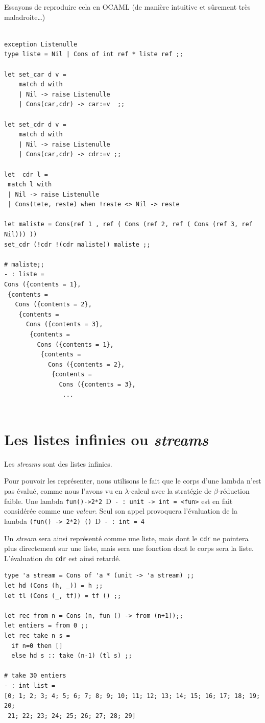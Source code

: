 \documentclass[11pt]{book}
\newcommand{\imp}{{\letterimp D}\hspace{0.1cm}}
\begin{document}
Essayons de reproduire cela en OCAML
(de manière intuitive et sûrement très maladroite\ldots)
\begin{Verbatim}

exception Listenulle
type liste = Nil | Cons of int ref * liste ref ;;

let set_car d v =
	match d with
	| Nil -> raise Listenulle
	| Cons(car,cdr) -> car:=v  ;;
	
let set_cdr d v =
	match d with
	| Nil -> raise Listenulle
	| Cons(car,cdr) -> cdr:=v ;;
	
let  cdr l =
 match l with
 | Nil -> raise Listenulle
 | Cons(tete, reste) when !reste <> Nil -> reste

let maliste = Cons(ref 1 , ref ( Cons (ref 2, ref ( Cons (ref 3, ref Nil))) ))
set_cdr (!cdr !(cdr maliste)) maliste ;;

# maliste;;
- : liste =
Cons ({contents = 1},
 {contents =
   Cons ({contents = 2},
    {contents =
      Cons ({contents = 3},
       {contents =
         Cons ({contents = 1},
          {contents =
            Cons ({contents = 2},
             {contents =
               Cons ({contents = 3},
               	...
               	
\end{Verbatim}

\section{Les listes infinies ou \textit{streams}}	
Les \textit{streams} sont des listes infinies.

Pour pouvoir les représenter, nous utilisons le fait que le corps d'une lambda n'est pas évalué, 
comme nous l'avons vu en $\lambda$-calcul avec la
stratégie de $\beta$-réduction faible.
Une lambda \verb+fun()->2*2+\ \imp\ \verb+- : unit -> int = <fun>+ est en fait considérée 
comme une \textit{valeur}. Seul son appel provoquera l'évaluation de la lambda
\verb+(fun() -> 2*2) ()+\ \imp\  \verb+- : int = 4+

Un \textit{stream} sera ainsi représenté comme une liste, mais dont le \verb+cdr+ ne pointera plus directement 
sur une liste, mais sera une fonction dont le corps sera la liste. L'évaluation du \verb+cdr+ est ainsi retardé.
 
\begin{Verbatim}
type 'a stream = Cons of 'a * (unit -> 'a stream) ;;
let hd (Cons (h, _)) = h ;;
let tl (Cons (_, tf)) = tf () ;;

let rec from n = Cons (n, fun () -> from (n+1));;
let entiers = from 0 ;;
let rec take n s =
  if n=0 then []
  else hd s :: take (n-1) (tl s) ;;

# take 30 entiers
- : int list =
[0; 1; 2; 3; 4; 5; 6; 7; 8; 9; 10; 11; 12; 13; 14; 15; 16; 17; 18; 19; 20;
 21; 22; 23; 24; 25; 26; 27; 28; 29]
\end{Verbatim}
\end{document}
